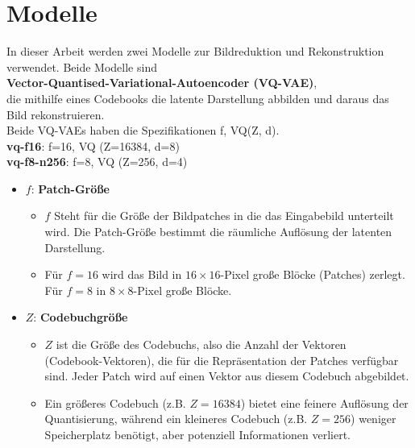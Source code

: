 \chapter{Modelle} 
    \cite{rombach2021highresolution, https://doi.org/10.48550/arxiv.2204.11824} In dieser Arbeit werden zwei Modelle zur Bildreduktion und Rekonstruktion verwendet. Beide Modelle sind\\
    \textbf{Vector-Quantised-Variational-Autoencoder (VQ-VAE)},\\
    die mithilfe eines Codebooks die latente Darstellung abbilden und daraus das Bild rekonstruieren.\\
    Beide VQ-VAEs haben die Spezifikationen f, VQ(Z, d).\\
    \textbf{vq-f16}: f=16, VQ (Z=16384, d=8)\\
    \textbf{vq-f8-n256}: f=8, VQ (Z=256, d=4)
    
    \begin{itemize} \item \( f \): \textbf{Patch-Größe}
        \begin{itemize}
            \item \( f \) Steht für die Größe der Bildpatches in die das Eingabebild unterteilt wird.
                    Die Patch-Größe bestimmt die räumliche Auflösung der latenten Darstellung.
            \item Für \( f = 16 \) wird das Bild in \( 16 \times 16 \)-Pixel große Blöcke (Patches) zerlegt.\\
            Für \( f = 8 \) in \( 8 \times 8 \)-Pixel große Blöcke.
        \end{itemize}
    \end{itemize}

    \begin{itemize} \item \( Z \): \textbf{Codebuchgröße}
        \begin{itemize}
            \item \( Z \) ist die Größe des Codebuchs, also die Anzahl der Vektoren\\(Codebook-Vektoren),
            die für die Repräsentation der Patches verfügbar sind.
            Jeder Patch wird auf einen Vektor aus diesem Codebuch abgebildet.
            \item Ein größeres Codebuch (z.B. $Z=16384$) bietet eine feinere Auflösung der Quantisierung, während ein kleineres Codebuch (z.B. $Z=256$) weniger Speicherplatz benötigt, aber potenziell Informationen verliert.
        \end{itemize}
    \end{itemize}

